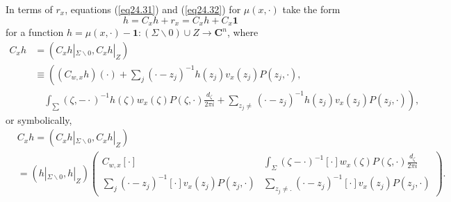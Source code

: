 \documentclass{surv-l}
\theoremstyle{plain}
\theoremstyle{definition}
\numberwithin{equation}{chapter}
\begin{document}
In terms of $r_{x}$, equations (\ref{eq24.31}) and (\ref{eq24.32}) for $\mu(x, \cdot)$ take the form
\begin{equation}\label{eq26.4}
h=C_{x}h+r_{x}=C_{x}h+C_{x}\mathbf{1}
\end{equation}
for a function $h=\mu(x, \cdot)-\mathbf{1}:(\Sigma\backslash 0)\cup Z\rightarrow \mathbf{C}^{n}$, where
\begin{align}
C_{x}h &=(C_{x}h|_{\Sigma\backslash 0},C_{x}h|_{Z})\\\nonumber
&\equiv \left((C_{w, x}h)(\cdot)+\sum_{j}(\cdot-z_{j})^{-1}h(z_{j})v_{x}(z_{j})P(z_{j},\cdot),\right.\\\nonumber
&\quad\left.\int_{\sum}(\zeta, -\cdot)^{-1}h(\zeta)w_{x}(\zeta)P(\zeta, \cdot)\frac{d_{\zeta}}{2\pi i}+\sum_{z_{j}\neq}(\cdot-z_{j})^{-1}h(z_{j})v_{x}(z_{j})P(z_{j},\cdot)\right),
\end{align}
or symbolically,
\begin{align}\label{eq26.6}
&C_{x}h  =(C_{x}h|_{\Sigma\backslash 0},C_{x}h|_{Z})\\ \nonumber
&=(h|_{\Sigma\backslash 0}, h|_{Z})  \left(\begin{array}{cc}
C_{w,x}[\cdot] & \int_{\Sigma}(\zeta-\cdot)^{-1}[\cdot]w_{x}(\zeta)P(\zeta, \cdot)\frac{d_{\zeta}}{2{\pi i}}\\\nonumber
\sum_{j}(\cdot-z_{j})^{-1}[\cdot]v_{x}(z_{j})P(z_{j},\cdot) & \sum_{z_{j}\neq.}(\cdot-z_{j})^{-1}[\cdot]v_{x}(z_{j})P(z_{j},\cdot)
\end{array}\right).
\end{align}
\end{document}
